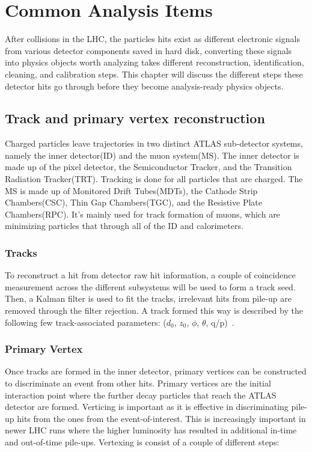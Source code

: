 \chapter{Common Analysis Items}
After collisions in the LHC, the particles hits exist as different electronic signals from various detector components saved in hard disk, converting these signals into physics objects worth analyzing takes different reconstruction, identification, cleaning, and calibration steps. This chapter will discuss the different steps these detector hits go through before they become analysis-ready physics objects. 

\section{Track and primary vertex reconstruction}

Charged particles leave trajectories in two distinct ATLAS sub-detector systems, namely the inner detector(ID) and the muon system(MS). The inner detector is made up of the pixel detector, the Semiconductor Tracker, and the Transition Radiation Tracker(TRT). Tracking is done for all particles that are charged. 
The MS is made up of Monitored Drift Tubes(MDTs), the Cathode Strip Chambers(CSC), Thin Gap Chambers(TGC), and the Resistive Plate Chambers(RPC). It's mainly used for
track formation of muons, which are minimizing particles that through all of the ID and calorimeters.


\subsection*{Tracks}
To reconstruct a hit from detector raw hit information, a couple of  coincidence measurement across the different subsystems will be used to form a track seed. Then, a Kalman filter is used to fit the tracks,  irrelevant hits from pile-up are removed through the filter rejection.  
A track formed this way is described by the following few track-associated parameters: ($d_{0}$, $z_{0}$, $\phi$, $\theta$, q/p)~\cite{}.

\subsection*{Primary Vertex}
Once tracks are formed in the inner detector, primary vertices can be constructed to discriminate an event from other hits. 
Primary vertices are the initial interaction point where the further decay particles that reach the ATLAS detector are formed. Verticing is important as it is effective in discriminating pile-up hits from the ones from the event-of-interest. This is increasingly important in newer LHC runs where the higher luminosity has resulted in additional in-time and out-of-time pile-ups. 
Vertexing is consist of a couple of different steps:

